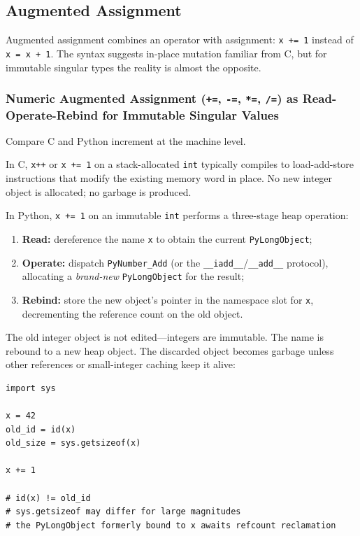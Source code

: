 \subsection{Augmented Assignment}

Augmented assignment combines an operator with assignment: \texttt{x += 1} instead of \texttt{x = x + 1}. The syntax suggests in-place mutation familiar from C, but for immutable singular types the reality is almost the opposite.

\subsubsection{Numeric Augmented Assignment (\texttt{+=}, \texttt{-=}, \texttt{*=}, \texttt{/=}) as Read-Operate-Rebind for Immutable Singular Values}

Compare C and Python increment at the machine level.

In C, \texttt{x++} or \texttt{x += 1} on a stack-allocated \texttt{int} typically compiles to load-add-store instructions that modify the existing memory word in place. No new integer object is allocated; no garbage is produced.

In Python, \texttt{x += 1} on an immutable \texttt{int} performs a three-stage heap operation:

\begin{enumerate}
    \item \textbf{Read:} dereference the name \texttt{x} to obtain the current \texttt{PyLongObject};
    \item \textbf{Operate:} dispatch \texttt{PyNumber\_Add} (or the \texttt{\_\_iadd\_\_}/\texttt{\_\_add\_\_} protocol), allocating a \emph{brand-new} \texttt{PyLongObject} for the result;
    \item \textbf{Rebind:} store the new object's pointer in the namespace slot for \texttt{x}, decrementing the reference count on the old object.
\end{enumerate}

The old integer object is not edited---integers are immutable. The name is rebound to a new heap object. The discarded object becomes garbage unless other references or small-integer caching keep it alive:

\begin{verbatim}
import sys

x = 42
old_id = id(x)
old_size = sys.getsizeof(x)

x += 1

# id(x) != old_id
# sys.getsizeof may differ for large magnitudes
# the PyLongObject formerly bound to x awaits refcount reclamation
\end{verbatim}

